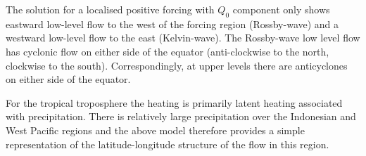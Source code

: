 \documentclass{jknotes}
\begin{document}
The solution for a localised positive forcing with $Q_0$ component only shows
eastward low-level flow to the west of the forcing region (Rossby-wave) and a
westward low-level flow to the east (Kelvin-wave). The Rossby-wave low level
flow has cyclonic flow on either side of the equator (anti-clockwise to the
north, clockwise to the south). Correspondingly, at upper levels there are
anticyclones on either side of the equator.

For the tropical troposphere the heating is primarily latent heating
associated with precipitation. There is relatively large precipitation over
the Indonesian and West Pacific regions and the above model therefore provides
a simple representation of the latitude-longitude structure of the flow in
this region.
\end{document}
